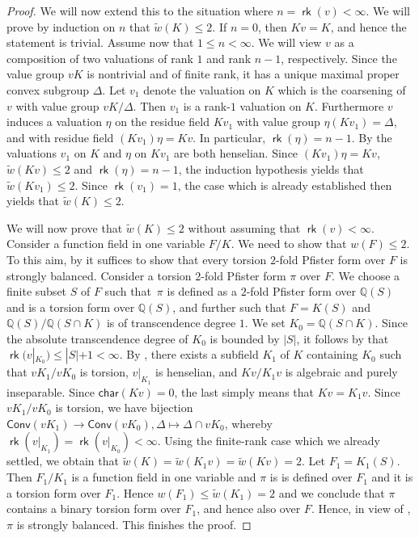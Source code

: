\documentclass[twoside,11pt]{amsart}
\numberwithin{equation}{section}
\theoremstyle{definition}
\newcommand{\car}{\mathsf{char}}
\renewcommand{\leq}{\leqslant}
\newcommand\rk{\operatorname{\mathsf{rk}}}
\renewcommand{\leq}{\leqslant}
\newcommand{\qq}{\mathbb{Q}}
\newcommand{\wt}{\widetilde}
\begin{document}
\begin{proof}
We will now extend this 
to the situation where $n=\rk(v)<\infty$.
We will prove by induction on $n$ that $\wt{w}(K)\leq 2$.
If $n=0$, then $Kv=K$, and hence the statement is trivial.
Assume now that $1\leq n<\infty$. 
We will view $v$ as a composition of two valuations of rank $1$ and rank $n-1$, respectively.
Since the value group $vK$ is nontrivial and of finite rank, it has a unique maximal proper convex subgroup $\Delta$. 
Let $v_1$ denote the valuation on
$K$ which is the coarsening of $v$ with value group $vK/\Delta$.
Then $v_1$ is a rank-$1$ valuation on $K$.
Furthermore $v$ induces a valuation $\eta$ on the residue field $K{v_1}$ with value
group $\eta (K{v_1}) = \Delta$, and with residue field $(K{v_1}) \eta = Kv$. In particular, $\rk(\eta)=n-1$.
By \cite[Cor.~4.1.4]{EP05} the valuations $v_1$ on $K$ and $\eta$ on $K{v_1}$
are both henselian. 
Since $(Kv_1)\eta=Kv$, $\wt{w}(Kv)\leq 2$ and $\rk(\eta)=n-1$, the induction hypothesis yields that $\wt{w}(Kv_1)\leq 2$.
Since $\rk(v_1)=1$, the  case which is already established then yields that 
$\wt{w}(K)\leq 2$.


We will now prove that $\wt{w}(K)\leq 2$ without assuming that $\rk(v)<\infty$.
Consider a function field in one variable $F/K$.
We need to show that $w(F)\leq 2$.
To this aim, by  it suffices to show that every torsion $2$-fold Pfister form over $F$ is strongly balanced.
Consider a torsion $2$-fold Pfister form $\pi$ over $F$.
We choose a finite subset $S$ of $F$ such that~$\pi$ is defined as a $2$-fold Pfister form over $\qq(S)$ and is a torsion form over $\qq(S)$, and further such that
    $F=K(S)$ and $\qq(S)/\qq(S\cap K)$ is of transcendence degree $1$.
    We set $K_0=\qq(S\cap K)$. 
    Since the absolute transcendence degree of $K_0$ is bounded by $|S|$, it follows by \cite[Theorem~3.4.3]{EP05} that $\rk(v|_{K_0})\leq |S|+1<\infty$.
    By \cite[Lemma 2.3]{BDM25}, there exists a subfield $K_1$ of $K$ containing $K_0$ such that $vK_1/vK_0$ is torsion, $v|_{K_1}$ is henselian, and $Kv/K_1v$ is algebraic and purely inseparable.
    Since $\car(Kv)=0$, the last simply means that $Kv=K_1v$.
    Since $vK_1/vK_0$ is torsion, we have bijection $\mathsf{Conv}(vK_1)\to\mathsf{Conv}(vK_0),\Delta\mapsto \Delta\cap vK_0$, whereby $\rk(v|_{K_1})=\rk(v|_{K_0})<\infty$.
    Using the finite-rank case which we already settled, we obtain that $\wt{w}(K)=\wt{w}(K_1v)=\wt{w}(Kv)=2$.
    Let $F_1=K_1(S)$.
    Then $F_1/K_1$ is a function field in one variable and $\pi$ is is defined over $F_1$ and it is a torsion form over $F_1$.
    Hence $w(F_1)\leq \wt{w}(K_1)=2$ and we conclude that $\pi$ contains a binary torsion form over $F_1$, and hence also over $F$.
    Hence, in view of , $\pi$ is strongly balanced.
    This finishes the proof.
\end{proof}
\end{document}
